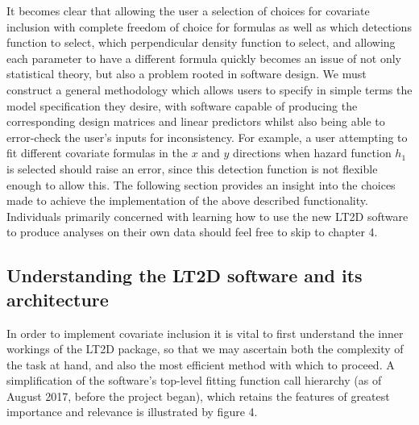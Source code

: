 \documentclass[11pt]{article}
\begin{document}
\begin{multicols}{2}
It becomes clear that allowing the user a selection of choices for covariate inclusion with complete freedom of choice for formulas as well as which detections function to select, which perpendicular density function to select, and allowing each parameter to have a different formula quickly becomes an issue of not only statistical theory, but also a problem rooted in software design. We must construct a general methodology which allows users to specify in simple terms the model specification they desire, with software capable of producing the corresponding design matrices and linear predictors whilst also being able to error-check the user's inputs for inconsistency. For example, a user attempting to fit different covariate formulas in the $x$ and $y$ directions when hazard function $h_1$ is selected should raise an error, since this detection function is not flexible enough to allow this. The following section provides an insight into the choices made to achieve the implementation of the above described functionality. Individuals primarily concerned with learning how to use the new LT2D software to produce analyses on their own data should feel free to skip to chapter 4.

\subsection{Understanding the LT2D software and its architecture}
In order to implement covariate inclusion it is vital to first understand the inner workings of the LT2D package, so that we may ascertain both the complexity of the task at hand, and also the most efficient method with which to proceed. A simplification of the software's top-level fitting function call hierarchy (as of August 2017, before the project began), which retains the features of greatest importance and relevance is illustrated by figure 4.


\end{multicols}
\end{document}
